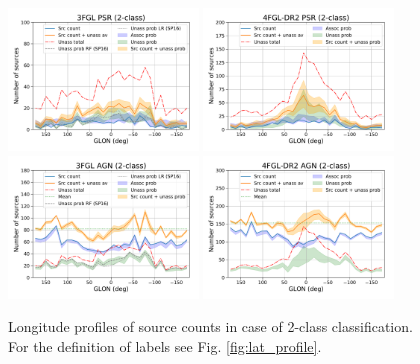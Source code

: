 \begin{figure}[h]
\centering
\includegraphics[width=0.45\textwidth]{plots/lon_profile_PSR_3FGL_2classes.pdf}
\includegraphics[width=0.45\textwidth]{plots/lon_profile_PSR_4FGL-DR2_2classes.pdf} \\
\includegraphics[width=0.45\textwidth]{plots/lon_profile_AGN_3FGL_2classes.pdf}
\includegraphics[width=0.45\textwidth]{plots/lon_profile_AGN_4FGL-DR2_2classes.pdf}
\caption{Longitude profiles of source counts in case of 2-class classification. For the definition of labels see Fig. \ref{fig:lat_profile}.}  
\label{fig:lon_profile}
\end{figure}



